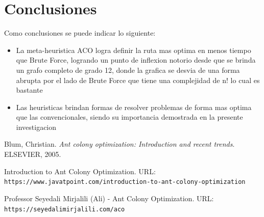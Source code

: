 \documentclass[12pt]{article}
\begin{document}
\section{Conclusiones}
Como conclusiones se puede indicar lo siguiente:

\begin{itemize}
    \item La meta-heuristica ACO logra definir la ruta mas optima en menos tiempo que Brute Force, logrando un punto de inflexion notorio
        desde que se brinda un grafo completo de grado 12, donde la grafica se desvia de una forma abrupta por el lado de Brute Force que tiene una complejidad de n! lo cual es bastante
    \item Las heuristicas brindan formas de resolver problemas de forma mas optima que las convencionales, siendo su importancia demostrada en la presente investigacion
\end{itemize}

\begin{thebibliography}{9}
    Blum, Christian. \textit{Ant colony optimization: Introduction and recent trends}. ELSEVIER, 2005.

    Introduction to Ant Colony Optimization. URL: \texttt{https://www.javatpoint.com/introduction-to-ant-colony-optimization}
    
    Professor Seyedali Mirjalili (Ali) - Ant Colony Optimization. URL: \texttt{https://seyedalimirjalili.com/aco}

\end{thebibliography}
\end{document}
